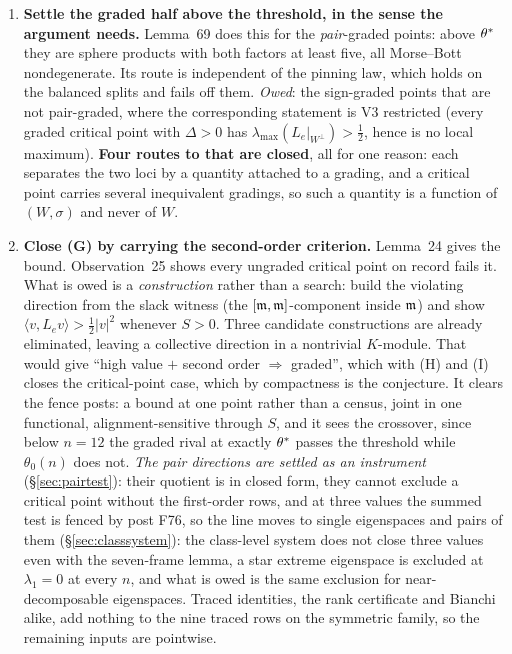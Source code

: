 \begin{enumerate}[leftmargin=1.8em]
\item \textbf{Settle the graded half above the threshold, in the sense the argument needs.} Lemma~69 does this for the \emph{pair}-graded points: above $\theta^{*}$ they are sphere products with both factors at least five, all Morse--Bott nondegenerate. Its route is independent of the pinning law, which holds on the balanced splits and fails off them. \emph{Owed}: the sign-graded points that are not pair-graded, where the corresponding statement is V3 restricted (every graded critical point with $\Delta>0$ has $\lambda_{\max}(L_e|_{W^\perp})>\tfrac12$, hence is no local maximum). \textbf{Four routes to that are closed}, all for one reason: each separates the two loci by a quantity attached to a grading, and a critical point carries several inequivalent gradings, so such a quantity is a function of $(W,\sigma)$ and never of $W$.

\item \textbf{Close (G) by carrying the second-order criterion.} Lemma~24 gives the bound. Observation~25 shows every ungraded critical point on record fails it. What is owed is a \emph{construction} rather than a search: build the violating direction from the slack witness (the $[\mathfrak{m},\mathfrak{m}]$-component inside $\mathfrak{m}$) and show $\langle v,L_ev\rangle>\tfrac12|v|^2$ whenever $S>0$. Three candidate constructions are already eliminated, leaving a collective direction in a nontrivial $K$-module. That would give ``high value $+$ second order $\Rightarrow$ graded'', which with (H) and (I) closes the critical-point case, which by compactness is the conjecture. It clears the fence posts: a bound at one point rather than a census, joint in one functional, alignment-sensitive through $S$, and it sees the crossover, since below $n=12$ the graded rival at exactly $\theta^{*}$ passes the threshold while $\theta_0(n)$ does not. \emph{The pair directions are settled as an instrument} (\S\ref{sec:pairtest}): their quotient is in closed form, they cannot exclude a critical point without the first-order rows, and at three values the summed test is fenced by post F76, so the line moves to single eigenspaces and pairs of them (\S\ref{sec:classsystem}): the class-level system does not close three values even with the seven-frame lemma, a star extreme eigenspace is excluded at $\lambda_1=0$ at every $n$, and what is owed is the same exclusion for near-decomposable eigenspaces. Traced identities, the rank certificate and Bianchi alike, add nothing to the nine traced rows on the symmetric family, so the remaining inputs are pointwise.


\end{enumerate}
